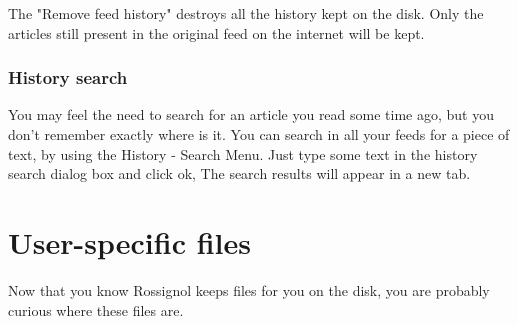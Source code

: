 \documentclass[11pt]{article} %
\begin{document}
The "Remove feed history" destroys all the history kept on the disk. Only the 
articles still present in the original feed on the internet will be kept. 

\subsubsection{History search}

You may feel the need to search for an article you read some time ago, but you 
don't remember exactly where is it. You can search in all your feeds 
for a piece of text, by using the History - Search Menu. Just type some text in 
the history search dialog box and click ok, The search results will appear in a 
new tab.

\section{User-specific files}

Now that you know Rossignol keeps files for you on the disk, you are probably 
curious where these files are. 
\end{document}
